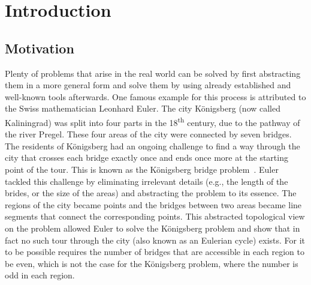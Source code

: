 \chapter{Introduction}
\label{cha:introduction}


\section{Motivation}
\label{sec:motivation}

Plenty of problems that arise in the real world can be solved by first abstracting them in a more general form and solve them by using already established and well-known tools afterwards.
One famous example for this process is attributed to the Swiss mathematician Leonhard Euler.
The city Königsberg (now called Kaliningrad) was split into four parts in the 18\textsuperscript{th} century, due to the pathway of the river Pregel.
These four areas of the city were connected by seven bridges.
The residents of Königsberg had an ongoing challenge to find a way through the city that crosses each bridge exactly once and ends once more at the starting point of the tour.
This is known as the Königsberg bridge problem~\cite{Paoletti2011, Cook2012}.
Euler tackled this challenge by eliminating irrelevant details (e.g., the length of the brides, or the size of the areas) and abstracting the problem to its essence.
The regions of the city became points and the bridges between two areas became line segments that connect the corresponding points.
This abstracted topological view on the problem allowed Euler to solve the Königsberg problem and show that in fact no such tour through the city (also known as an Eulerian cycle) exists.
For it to be possible requires the number of bridges that are accessible in each region to be even, which is not the case for the Königsberg problem, where the number is odd in each region.


